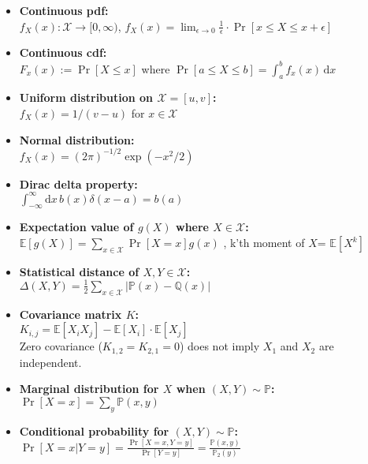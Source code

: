 \documentclass[twocolumn,9pt]{extarticle}
\begin{document}
\begin{itemize}
	\item \textbf{Continuous pdf: } \\
	$f_X(x) : \mathcal{X} \rightarrow [0,\infty)$, $f_X(x) = \lim_{\epsilon \to 0} \frac{1}{\epsilon} \cdot \Pr[x \leq X \leq x + \epsilon]$

	\item \textbf{Continuous cdf: } \\
	$F_x(x) := \Pr[X \leq x]$ where $\Pr[a \leq X \leq b] = \int_a^b f_x(x) \, \mathrm{d} x$

	\item \textbf{Uniform distribution on $\mathcal{X} = [u,v]$: } \\
	$f_X(x) = 1/(v - u)$ for $x \in \mathcal{X}$

	\item \textbf{Normal distribution: } \\
	$f_X(x) = (2\pi)^{-1/2} \exp(-x^2/2)$

	\item \textbf{Dirac delta property: } \\
	$\int_{-\infty}^\infty \mathrm{d} x \, b(x)\delta(x-a) = b(a)$

	\item \textbf{Expectation value of $g(X)$ where $X \in \mathcal{X}$: } \\
	$\mathbb{E}[g(X)] = \sum_{x \in \mathcal{X}} \Pr[X = x] g(x)$
	, k'th moment of $X$= $\mathbb{E}[X^k]$

	\item \textbf{Statistical distance of $X, Y \in \mathcal{X}$: } \\
	$\Delta(X,Y) = \frac{1}{2} \sum_{x \in \mathcal{X}} |\mathbb{P}(x) - \mathbb{Q}(x)|$

	\item \textbf{Covariance matrix $K$: } \\
	$K_{i,j} = \mathbb{E}[X_i X_j] - \mathbb{E}[X_i] \cdot \mathbb{E}[X_j]$\\
	Zero covariance ($K_{1,2} = K_{2,1} = 0$) does not imply $X_1$ and $X_2$ are independent.

	\item \textbf{Marginal distribution for $X$ when $(X,Y) \sim \mathbb{P}$: } \\
	$\Pr[X = x] = \sum_y \mathbb{P}(x,y)$

	\item \textbf{Conditional probability for $(X,Y) \sim \mathbb{P}$: } \\
	$\Pr[X = x|Y = y] = \frac{\Pr[X = x, Y = y]}{\Pr[Y = y]} = \frac{\mathbb{P}(x,y)}{\mathbb{P}_2(y)}$


\end{itemize}
\end{document}
